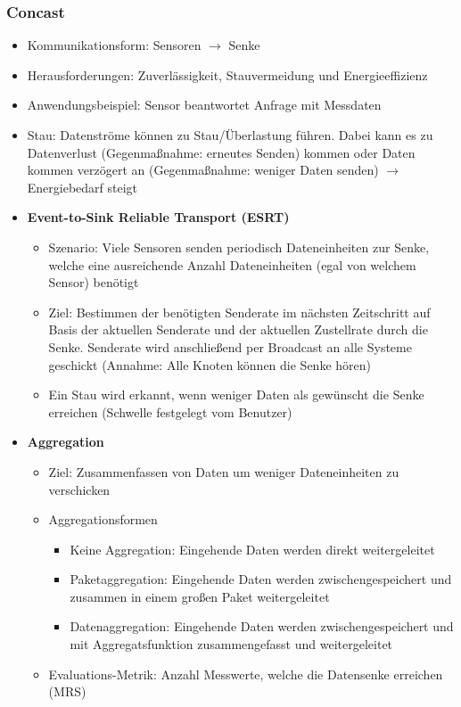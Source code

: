 \subsubsection{Concast}
\begin{itemize}
	\item Kommunikationsform: Sensoren \(\rightarrow\) Senke
	\item Herausforderungen: Zuverlässigkeit, Stauvermeidung und Energieeffizienz
	\item Anwendungsbeispiel: Sensor beantwortet Anfrage mit Messdaten
	\item Stau: Datenströme können zu Stau/Überlastung führen. Dabei kann es zu Datenverlust (Gegenmaßnahme: erneutes Senden) kommen oder Daten kommen verzögert an (Gegenmaßnahme: weniger Daten senden) \(\rightarrow\) Energiebedarf steigt
	\item \textbf{Event-to-Sink Reliable Transport (ESRT)}
	\begin{itemize}
		\item Szenario: Viele Sensoren senden periodisch Dateneinheiten zur Senke, welche eine ausreichende Anzahl Dateneinheiten (egal von welchem Sensor) benötigt
		\item Ziel: Bestimmen der benötigten Senderate im nächsten Zeitschritt auf Basis der aktuellen Senderate und der aktuellen Zustellrate durch die Senke. Senderate wird anschließend per Broadcast an alle Systeme geschickt (Annahme: Alle Knoten können die Senke hören)
		\item Ein Stau wird erkannt, wenn weniger Daten als gewünscht die Senke erreichen (Schwelle festgelegt vom Benutzer)
	\end{itemize}
	\item \textbf{Aggregation}
	\begin{itemize}
		\item Ziel: Zusammenfassen von Daten um weniger Dateneinheiten zu verschicken
		\item Aggregationsformen
		\begin{itemize}
			\item Keine Aggregation: Eingehende Daten werden direkt weitergeleitet
			\item Paketaggregation: Eingehende Daten werden zwischengespeichert und zusammen in einem großen Paket weitergeleitet
			\item Datenaggregation: Eingehende Daten werden zwischengespeichert und mit Aggregatsfunktion zusammengefasst und weitergeleitet
		\end{itemize}
		\item Evaluations-Metrik: Anzahl Messwerte, welche die Datensenke erreichen (MRS)

\end{itemize}
\end{itemize}
